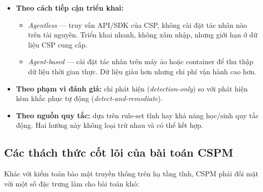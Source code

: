 \begin{itemize}
  \item \textbf{Theo cách tiếp cận triển khai:}
    \begin{itemize}
      \item \textit{Agentless} --- truy vấn API/SDK của CSP, không cài đặt tác nhân nào trên tài nguyên. Triển khai nhanh, không xâm nhập, nhưng giới hạn ở dữ liệu CSP cung cấp.
      \item \textit{Agent-based} --- cài đặt tác nhân trên máy ảo hoặc container để thu thập dữ liệu thời gian thực. Dữ liệu giàu hơn nhưng chi phí vận hành cao hơn.
    \end{itemize}
  \item \textbf{Theo phạm vi đánh giá:} chỉ phát hiện (\textit{detection-only}) so với phát hiện kèm khắc phục tự động (\textit{detect-and-remediate}).
  \item \textbf{Theo nguồn quy tắc:} dựa trên rule-set tĩnh hay khả năng học/sinh quy tắc động. Hai hướng này không loại trừ nhau và có thể kết hợp.
\end{itemize}

\subsection{Các thách thức cốt lõi của bài toán CSPM}
\label{subsec:cspm-challenges}

Khác với kiểm toán bảo mật truyền thống trên hạ tầng tĩnh, CSPM phải đối mặt với một số đặc trưng làm cho bài toán khó:

